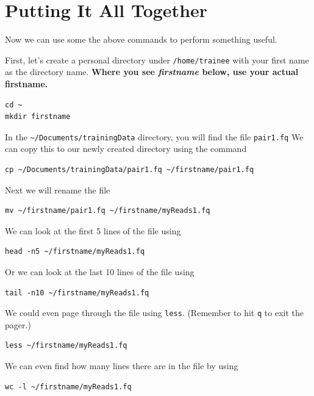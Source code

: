 \documentclass[a4paper,12pt,twoside]{memoir}
\begin{document}
\section{Putting It All Together}
Now we can use some the above commands to perform something useful. \\

\begin{steps}
First, let's create a personal directory under \texttt{/home/trainee} with your first name as the directory name.
\textbf{Where you see \textit{firstname} below, use your actual firstname.}\\
\begin{lstlisting}
cd ~
mkdir firstname
\end{lstlisting}
\end{steps}

\begin{steps}
In the \texttt{\~{}/Documents/trainingData} directory, you will find the file \texttt{pair1.fq}
We can copy this to our newly created directory using the command \\
\begin{lstlisting}
cp ~/Documents/trainingData/pair1.fq ~/firstname/pair1.fq
\end{lstlisting}

Next we will rename the file \\
\begin{lstlisting}
mv ~/firstname/pair1.fq ~/firstname/myReads1.fq
\end{lstlisting}

We can look at the first 5 lines of the file using \\
\begin{lstlisting}
head -n5 ~/firstname/myReads1.fq
\end{lstlisting}

Or we can look at the last 10 lines of the file using \\
\begin{lstlisting}
tail -n10 ~/firstname/myReads1.fq
\end{lstlisting}

We could even page through the file using \texttt{less}.
(Remember to hit \texttt{q} to exit the pager.)\\
\begin{lstlisting}
less ~/firstname/myReads1.fq
\end{lstlisting}

We can even find how many lines there are in the file by using \\
\begin{lstlisting}
wc -l ~/firstname/myReads1.fq
\end{lstlisting}
\end{steps}
\end{document}
